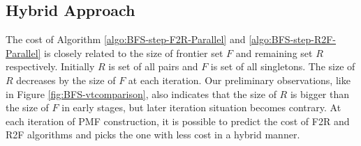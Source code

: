 \documentclass[12pt]{article}
\begin{document}
\subsection{Hybrid Approach}
\label{sec:BFS-Hybrid-parallel}
The cost of Algorithm \ref{algo:BFS-step-F2R-Parallel} and \ref{algo:BFS-step-R2F-Parallel} is closely related to the size of frontier set $F$ and remaining set $R$ respectively. Initially $R$ is set of all pairs and $F$ is set of all singletons. The size of $R$ decreases by the size of $F$ at each iteration. Our preliminary observations, like in Figure \ref{fig:BFS-vtcomparison}, also indicates that the size of $R$ is bigger than the size of $F$ in early stages, but later iteration situation becomes contrary. At each iteration of PMF construction, it is possible to predict the cost of F2R and R2F algorithms and picks the one with less cost in a hybrid manner. 
\end{document}

